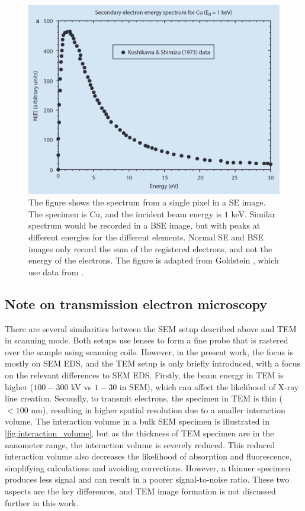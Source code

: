 \begin{figure}[ht]
    \centering
    \includegraphics[width=0.8\linewidth]{figures/SEM_SE_spectrums.png}
    \caption{
        The figure shows the spectrum from a single pixel in a SE image.
        The specimen is Cu, and the incident beam energy is $1$ keV.
        Similar spectrum would be recorded in a BSE image, but with peaks at different energies for the different elements.
        Normal SE and BSE images only record the sum of the registered electrons, and not the energy of the electrons.
        The figure is adapted from Goldstein \cite[Fig. 3.1 a]{goldstein_scanning_2018}, which use data from \cite{koshikawa_SE_spectrum_1973}.
    }
    \label{fig:SEM_SE_spectrums}
\end{figure}


\subsection{Note on transmission electron microscopy}
\label{theory:sem:tem}

There are several similarities between the SEM setup described above and TEM in scanning mode.
Both setups use lenses to form a fine probe that is rastered over the sample using scanning coils.
However, in the present work, the focus is mostly on SEM EDS, and the TEM setup is only briefly introduced, with a focus on the relevant differences to SEM EDS.
Firstly, the beam energy in TEM is higher ($100-300$ kV vs $1-30$ in SEM), which can affect the likelihood of X-ray line creation.
Secondly, to transmit electrons, the specimen in TEM is thin ($<100$ nm), resulting in higher spatial resolution due to a smaller interaction volume.
The interaction volume in a bulk SEM specimen is illustrated in \cref{fig:interaction_volume}, but as the thickness of TEM specimen are in the nanometer range, the interaction volume is severely reduced.
This reduced interaction volume also decreases the likelihood of absorption and fluorescence, simplifying calculations and avoiding corrections.
However, a thinner specimen produces less signal and can result in a poorer signal-to-noise ratio.
These two aspects are the key differences, and TEM image formation is not discussed further in this work.



